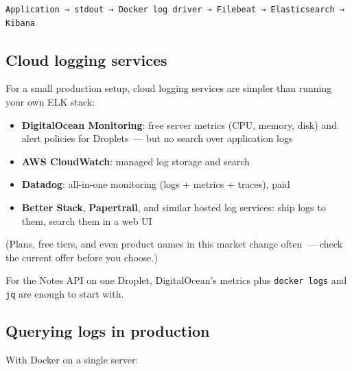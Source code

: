 \begin{outputbox}[short]
\begin{Verbatim}[fontsize=\codesize, breaklines, breakanywhere, breaksymbolleft={\tiny\textcolor{muted}{$\hookrightarrow$}}]
Application → stdout → Docker log driver → Filebeat → Elasticsearch → Kibana
\end{Verbatim}
\end{outputbox}

\subsection*{Cloud logging services}\label{35-observability:cloud-logging-services}

For a small production setup, cloud logging services are simpler than running your own ELK stack:

\begin{itemize}
\tightlist
\item
  \textbf{DigitalOcean Monitoring}: free server metrics (CPU, memory, disk) and alert policies for Droplets~--- but no search over application logs
\item
  \textbf{AWS CloudWatch}: managed log storage and search
\item
  \textbf{Datadog}: all-in-one monitoring (logs + metrics + traces), paid
\item
  \textbf{Better Stack}, \textbf{Papertrail}, and similar hosted log services: ship logs to them, search them in a web UI
\end{itemize}

\noindent{}(Plans, free tiers, and even product names in this market change often~--- check the current offer before you choose.)

For the Notes API on one Droplet, DigitalOcean's metrics plus \texttt{docker\ logs} and \texttt{jq} are enough to start with.

\subsection*{Querying logs in production}\label{35-observability:querying-logs-in-production}

With Docker on a single server:

